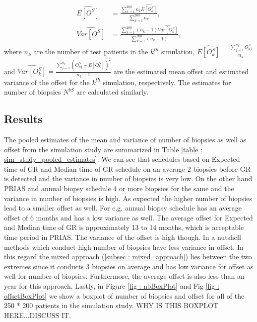 \begin{align*}
\widehat{E[O^S]} &= \frac{\sum_{k=1}^{200} n_k \widehat{E[O^S_k]}}{\sum_{k=1}^{200} n_k}, \\
\widehat{Var[O^S]} &= \frac{\sum_{k=1}^{200} (n_k - 1) \widehat{Var[O^S_k]}}{\sum_{k=1}^{200} (n_k-1)}, 
\end{align*}
where $n_k$ are the number of test patients in the $k^{th}$ simulation, $\widehat{E[O^S_k]} = \frac{\sum_{j=1}^{n_k}O^S_{kj}}{n_k}$ and $\widehat{Var[O^S_k]} = \frac{\sum_{j=1}^{n_k}(O^S_{kj} - \widehat{E[O^S_k]})^2}{n_k-1}$ are the estimated mean offset and estimated variance of the offset for the $k^{th}$ simulation, respectively. The estimates for number of biopsies $N^{bS}$ are calculated similarly.

\subsection{Results}
The pooled estimates of the mean and variance of number of biopsies as well as offset from the simulation study are summarized in Table \ref{table : sim_study_pooled_estimates}. We can see that schedules based on Expected time of GR and Median time of GR schedule on an average 2 biopsies before GR is detected and the variance in number of biopsies is very low. On the other hand PRIAS and annual biopsy schedule 4 or more biopsies for the same and the variance in number of biopsies is high. As expected the higher number of biopsies lead to a smaller offset as well. For e.g. annual biopsy schedule has an average offset of 6 months and has a low variance as well. The average offset for Expected and Median time of GR is approximately 13 to 14 months, which is acceptable time period in PRIAS. The variance of the offset is high though. In a nutshell methods which conduct high number of biopsies have less variance in offset. In this regard the mixed approach (\Section \ref{subsec : mixed_approach}) lies between the two extremes since it conducts 3 biopsies on average and has low variance for offset as well for number of biopsies. Furthermore, the average offset is also less than an year for this approach. Lastly, in Figure \ref{fig : nbBoxPlot} and Fig \ref{fig : offsetBoxPlot} we show a boxplot of number of biopsies and offset for all of the 250 * 200 patients in the simulation study. WHY IS THIS BOXPLOT HERE...DISCUSS IT.

